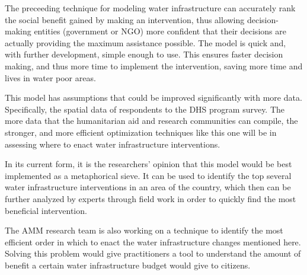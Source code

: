 The preceeding technique for modeling water infrastructure can accurately rank the social benefit gained by making an intervention, thus allowing decision-making entities (government or NGO) more confident that their decisions are actually providing the maximum assistance possible.
The model is quick and, with further development, simple enough to use.
This ensures faster decision making, and thus more time to implement the intervention, saving more time and lives in water poor areas.

This model has assumptions that could be improved significantly with more data.
Specifically, the spatial data of respondents to the DHS program survey.
The more data that the humanitarian aid and research communities can compile, the stronger, and more efficient optimization techniques like this one will be in assessing where to enact water infrastructure interventions.

In its current form, it is the researchers' opinion that this model would be best implemented as a metaphorical sieve.
It can be used to identify the top several water infrastructure interventions in an area of the country, which then can be further analyzed by experts through field work in order to quickly find the most beneficial intervention.

The AMM research team is also working on a technique to identify the most efficient order in which to enact the water infrastructure changes mentioned here.
Solving this problem would give practitioners a tool to understand the amount of benefit a certain water infrastructure budget would give to citizens.

